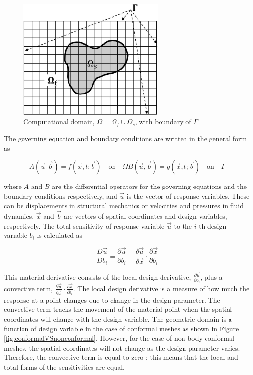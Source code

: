 \documentclass[12pt]{aiaa-pretty}
\begin{document}
%
\begin{figure}[H]
	\centering
	\includegraphics[height=6.0cm]{figure/domain.jpg}
	\caption{Computational domain, $\Omega = \Omega_f \cup \Omega_s$, with boundary of $\Gamma$}
	\label{fig:domain}
\end{figure}
%

The governing equation and boundary conditions are written in the general form as

%
\begin{subequations}\label{eq:generalFormForGE}
\begin{equation}
	A(\vec{u}, \vec{b}) = f(\vec{x}, t; \vec{b}) \quad \text{on} \quad \Omega
\end{equation}
\begin{equation}
	B(\vec{u}, \vec{b}) = g(\vec{x}, t; \vec{b}) \quad \text{on} \quad \Gamma
\end{equation}
\end{subequations}
%

where $A$ and $B$ are the differential operators for the governing equations and the boundary conditions respectively, and $\vec{u}$ is the vector of response variables. These can be displacements in structural mechanics or velocities and pressures in fluid dynamics. $\vec{x}$ and $\vec{b}$ are vectors of spatial coordinates and design variables, respectively. The total sensitivity of response variable $\vec{u}$ to the $i$-th design variable $b_i$ is calculated as

%
\begin{equation}
	\frac{D\vec{u}}{Db_i	} = \frac{\partial \vec{u}}{\partial b_i} + 
	                        \frac{\partial \vec{u}}{\partial \vec{x}} \cdot \frac{\partial \vec{x}}{\partial b_i}
\end{equation}
%

This material derivative consists of the local design derivative, $\frac{\partial \vec{u}}{\partial b_i}$, plus a convective term, $\frac{\partial \vec{u}}{\partial \vec{x}} \cdot \frac{\partial \vec{x}}{\partial b_i}$. The local design derivative is a measure of how much the response at a point changes due to change in the design parameter. The convective term tracks the movement of the material point when the spatial coordinates will change with the design variable. The geometric domain is a function of design variable in the case of conformal meshes as shown in Figure \ref{fig:conformalVSnonconformal}. However, for the case of non-body conformal meshes, the spatial coordinates will not change as the design parameter varies. Therefore, the convective term is equal to zero \cite{gobal2014continuum}; this means that the local and total forms of the sensitivities are equal.
\end{document}
